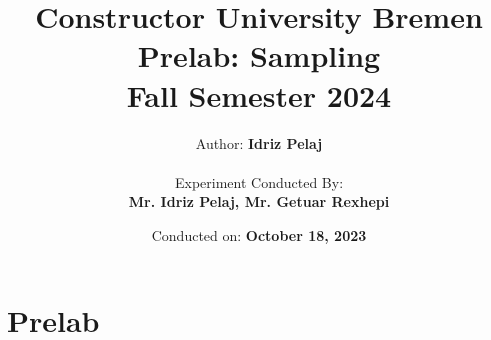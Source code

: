 \documentclass[12pt]{report}
\title{
    \textbf{Constructor University Bremen} \\
    \vspace{1cm}
    \textbf{Prelab: Sampling} \\ 
    Fall Semester 2024 \\
}
\author{
    Author: \textbf{Idriz Pelaj} \\
    \vspace{1cm} \\
    Experiment Conducted By: \\ \textbf{Mr. Idriz Pelaj, Mr. Getuar Rexhepi}
}
\date{Conducted on: \textbf{October 18, 2023}}
\begin{document}
\maketitle

\chapter{Prelab}
\vspace{-1cm}

\end{document}
